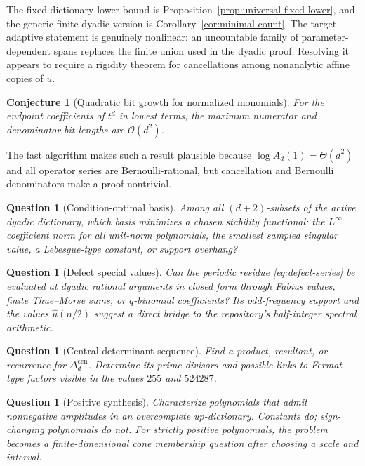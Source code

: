 \documentclass[11pt,oneside]{article}
\newtheorem{conjecture}[theorem]{Conjecture}
\newtheorem{question}[theorem]{Question}
\theoremstyle{definition}
\theoremstyle{remark}
\newcommand{\bigO}{\mathcal O}
\begin{document}
The fixed-dictionary lower bound is Proposition~\ref{prop:universal-fixed-lower}, and the generic finite-dyadic version is Corollary~\ref{cor:minimal-count}.  The target-adaptive statement is genuinely nonlinear: an uncountable family of parameter-dependent spans replaces the finite union used in the dyadic proof.  Resolving it appears to require a rigidity theorem for cancellations among nonanalytic affine copies of $u$.

\begin{conjecture}[Quadratic bit growth for normalized monomials]
For the endpoint coefficients of $t^d$ in lowest terms, the maximum numerator and denominator bit lengths are $\bigO(d^2)$.
\end{conjecture}

The fast algorithm makes such a result plausible because $\log A_d(1)=\Theta(d^2)$ and all operator series are Bernoulli-rational, but cancellation and Bernoulli denominators make a proof nontrivial.

\begin{question}[Condition-optimal basis]
Among all $(d+2)$-subsets of the active dyadic dictionary, which basis minimizes a chosen stability functional: the $L^\infty$ coefficient norm for all unit-norm polynomials, the smallest sampled singular value, a Lebesgue-type constant, or support overhang?
\end{question}

\begin{question}[Defect special values]
Can the periodic residue \eqref{eq:defect-series} be evaluated at dyadic rational arguments in closed form through Fabius values, finite Thue--Morse sums, or $q$-binomial coefficients?  Its odd-frequency support and the values $\widehat u(n/2)$ suggest a direct bridge to the repository's half-integer spectral arithmetic.
\end{question}

\begin{question}[Central determinant sequence]
Find a product, resultant, or recurrence for $\Delta_d^{\mathrm{cen}}$.  Determine its prime divisors and possible links to Fermat-type factors visible in the values $255$ and $524287$.
\end{question}

\begin{question}[Positive synthesis]
Characterize polynomials that admit nonnegative amplitudes in an overcomplete up-dictionary.  Constants do; sign-changing polynomials do not.  For strictly positive polynomials, the problem becomes a finite-dimensional cone membership question after choosing a scale and interval.
\end{question}
\end{document}
